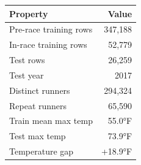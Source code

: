 \begin{tabular}{lr}
\hline
Property & Value \\
\hline
Pre-race training rows & 347,188 \\
In-race training rows & 52,779 \\
Test rows & 26,259 \\
Test year & 2017 \\
Distinct runners & 294,324 \\
Repeat runners & 65,590 \\
Train mean max temp & 55.0°F \\
Test max temp & 73.9°F \\
Temperature gap & +18.9°F \\
\hline
\end{tabular}
